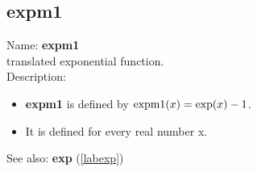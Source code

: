 \subsection{expm1}
\label{labexpm1}
\noindent Name: \textbf{expm1}\\
translated exponential function.\\

\noindent Description: \begin{itemize}

\item \textbf{expm1} is defined by ${\rm expm1}(x) = \exp(x)-1$.

\item It is defined for every real number x.
\end{itemize}
See also: \textbf{exp} (\ref{labexp})
